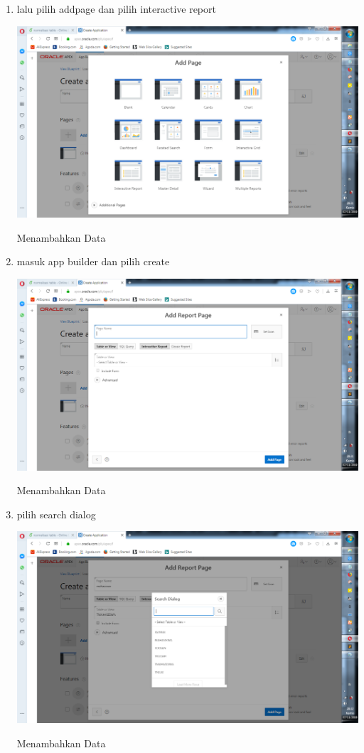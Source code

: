 \documentclass{article}
\begin{document}
\begin{enumerate}
\item lalu pilih addpage dan pilih interactive report
    \begin{center}
         \centering
            \includegraphics[scale=0.27]{gambar/18.png}
        \caption{Menambahkan Data}
        \label{excel}
    \end{center}
\item masuk app builder dan pilih create
    \begin{center}
         \centering
            \includegraphics[scale=0.27]{gambar/19.png}
        \caption{Menambahkan Data}
        \label{excel}
    \end{center}
    
\item pilih search dialog
    \begin{center}
         \centering
            \includegraphics[scale=0.27]{gambar/20.png}
        \caption{Menambahkan Data}
        \label{excel}
    \end{center}
    

\end{enumerate}
\end{document}
